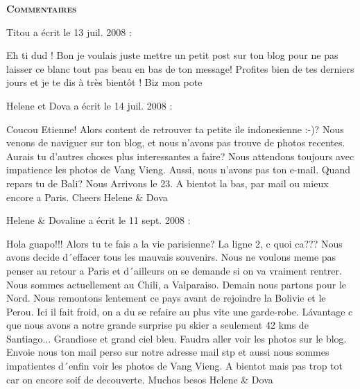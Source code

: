 \bigskip
\textbf{\textsc{Commentaires}}

 \medskip
Titou a écrit le 13 juil. 2008 :
\begin{displayquote}
Eh ti dud !
Bon je voulais juste mettre un petit post sur ton blog pour ne pas laisser ce blanc tout pas beau en bas de ton message! Profites bien de tes derniers jours et je te dis à très bientôt ! 
Biz mon pote
\end{displayquote}

 \medskip
Helene et Dova a écrit le 14 juil. 2008 :
\begin{displayquote}
Coucou Etienne!
Alors content de retrouver ta petite ile indonesienne :-)?
Nous venons de naviguer sur ton blog, et nous n'avons pas trouve de photos recentes. Aurais tu d'autres choses plus interessantes a faire?
Nous attendons toujours avec impatience les photos de Vang Vieng.
Aussi, nous n'avons pas ton e-mail. 
Quand repars tu de Bali? Nous Arrivons le 23. 
A bientot la bas, par mail ou mieux encore a Paris.
Cheers Helene & Dova
\end{displayquote}

 \medskip
Helene & Dovaline a écrit le 11 sept. 2008 :
\begin{displayquote}
Hola guapo!!!
Alors tu te fais a la vie parisienne? La ligne 2, c quoi ca??? Nous avons decide d´effacer tous les mauvais souvenirs. Nous ne voulons meme pas penser au retour a Paris et d´ailleurs on se demande si on va vraiment rentrer.
Nous sommes actuellement au Chili, a Valparaiso. Demain nous partons pour le Nord. Nous remontons lentement ce pays avant de rejoindre la Bolivie et le Perou. Ici il fait froid, on a du se refaire au plus vite une garde-robe. Lávantage c que nous avons a notre grande surprise pu skier a seulement 42 kms de Santiago... Grandiose et grand ciel bleu. Faudra aller voir les photos sur le blog.
Envoie nous ton mail perso sur notre adresse mail stp et aussi nous sommes impatientes d´enfin voir les photos de Vang Vieng.
A bientot mais pas trop tot car on encore soif de decouverte.
Muchos besos
Helene & Dova
\end{displayquote}

